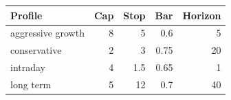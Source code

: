 \begin{tabular}{lrrrr}
\toprule
Profile & Cap & Stop & Bar & Horizon \\
\midrule
aggressive growth & 8 & 5 & 0.6 & 5 \\
conservative & 2 & 3 & 0.75 & 20 \\
intraday & 4 & 1.5 & 0.65 & 1 \\
long term & 5 & 12 & 0.7 & 40 \\
\bottomrule
\end{tabular}
